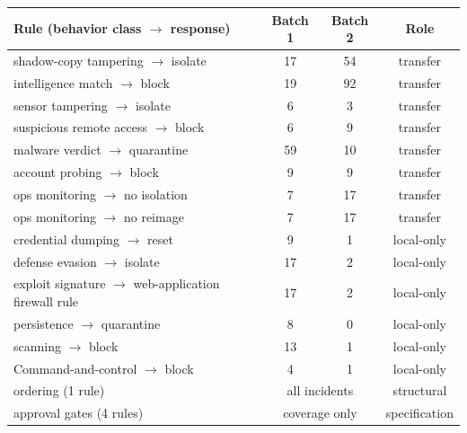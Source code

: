 \begin{tabular*}{\columnwidth}{@{\extracolsep{\fill}}>{\raggedright\arraybackslash}p{}ccc@{}}
\toprule
Rule (behavior class $\to$ response) & Batch 1 & Batch 2 & Role \\
\midrule
shadow-copy tampering $\to$ isolate & 17 & 54 & transfer \\
intelligence match $\to$ block & 19 & 92 & transfer \\
sensor tampering $\to$ isolate & 6 & 3 & transfer \\
suspicious remote access $\to$ block & 6 & 9 & transfer \\
malware verdict $\to$ quarantine & 59 & 10 & transfer \\
account probing $\to$ block & 9 & 9 & transfer \\
ops monitoring $\to$ no isolation & 7 & 17 & transfer \\
ops monitoring $\to$ no reimage & 7 & 17 & transfer \\
\addlinespace
credential dumping $\to$ reset & 9 & 1 & local-only \\
defense evasion $\to$ isolate & 17 & 2 & local-only \\
exploit signature $\to$ web-application firewall rule & 17 & 2 & local-only \\
persistence $\to$ quarantine & 8 & 0 & local-only \\
scanning $\to$ block & 13 & 1 & local-only \\
Command-and-control $\to$ block & 4 & 1 & local-only \\
\addlinespace
ordering (1 rule) & \multicolumn{2}{c}{all incidents} & structural \\
approval gates (4 rules) & \multicolumn{2}{c}{coverage only} & specification \\
\bottomrule
\end{tabular*}
